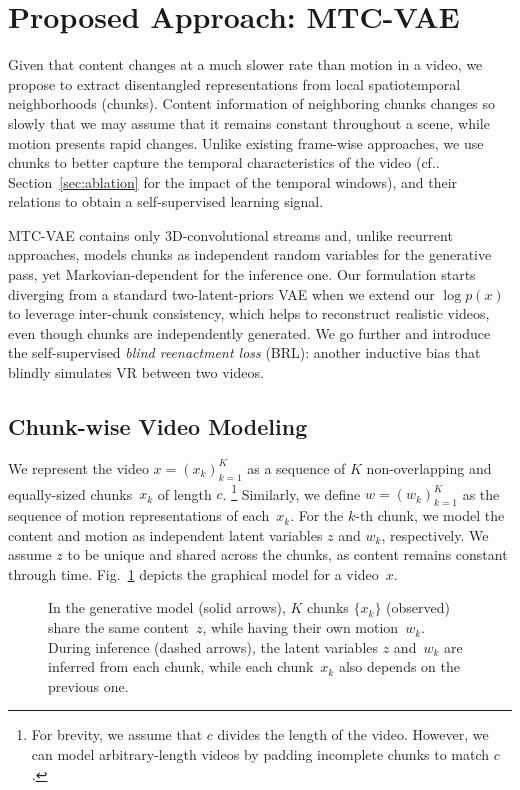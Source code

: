 \documentclass[journal]{IEEEtran}
\makeatletter
\DeclareRobustCommand\onedot{\futurelet\@let@token\@onedot}
\def\@onedot{\ifx\@let@token.\else.\null\fi\xspace}
\def\cf{{cf}\onedot} \def\Cf{{Cf}\onedot}
\makeatother
\begin{document}
\section{Proposed Approach: MTC-VAE}
\label{sec:method}

Given that content changes at a much slower rate than motion in a video, we propose to extract disentangled representations from local spatiotemporal neighborhoods (\aka chunks).
Content information of neighboring chunks changes so slowly that we may assume that it remains constant throughout a scene, while motion presents rapid changes.
Unlike existing frame-wise approaches, we use chunks to better capture the temporal characteristics of the video (\cf Section~\ref{sec:ablation} for the impact of the temporal windows), and their relations to obtain a self-supervised learning signal.

MTC-VAE contains only 3D-convolutional streams and, unlike recurrent approaches, models chunks as independent random variables for the generative pass, yet Markovian-dependent for the inference one.
Our formulation starts diverging from a standard two-latent-priors VAE when we extend our $\log p(x)$ to leverage inter-chunk consistency, which helps to reconstruct realistic videos, even though chunks are independently generated.
We go further and introduce the self-supervised \textit{blind reenactment loss} (BRL): another inductive bias that blindly simulates VR between two videos.

\subsection{Chunk-wise Video Modeling}
\label{sec:modeling}

We represent the video $x = (x_{k})_{k=1}^K$ as a sequence of $K$ non-overlapping and equally-sized chunks~$x_{k}$ of length $c$.%
\footnote{%
  For brevity, we assume that $c$ divides the length of the video.
  However, we can model arbitrary-length videos by padding incomplete chunks to match $c$.}
Similarly, we define $w = \left(w_k\right)_{k=1}^K$ as the sequence of motion representations of each~$x_k$.
For the $k$-th chunk, we model the content and motion as independent latent variables $z$ and $w_k$, respectively.
We assume $z$ to be unique and shared across the chunks, as content remains constant through time.
Fig.~\ref{fig:graphical_model} depicts the graphical model for a video~$x$.
\begin{figure}%
  \centering%
  \resizebox{0.5\linewidth}{!}{}
  \caption{%
  In the generative model (solid arrows), $K$ chunks $\{x_{k}\}$ (observed) share the same content~$z$, while having their own motion~$w_k$.
During inference (dashed arrows), the latent variables $z$ and~$w_k$ are inferred from each chunk, while each chunk~$x_k$ also depends on the previous one.
  }
  \label{fig:graphical_model}%
\end{figure}
\end{document}
